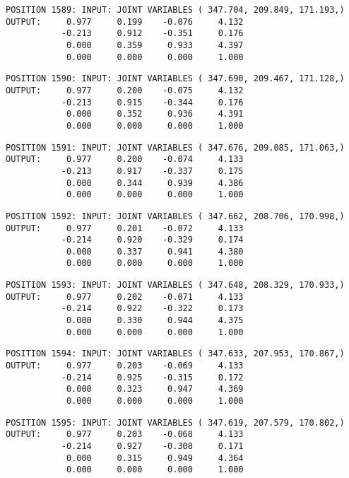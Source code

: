 \begin{verbatim}
POSITION 1589: INPUT: JOINT VARIABLES ( 347.704, 209.849, 171.193,)
OUTPUT:     0.977     0.199    -0.076     4.132
           -0.213     0.912    -0.351     0.176
            0.000     0.359     0.933     4.397
            0.000     0.000     0.000     1.000
\end{verbatim} \pagebreak[1]\begin{verbatim}
POSITION 1590: INPUT: JOINT VARIABLES ( 347.690, 209.467, 171.128,)
OUTPUT:     0.977     0.200    -0.075     4.132
           -0.213     0.915    -0.344     0.176
            0.000     0.352     0.936     4.391
            0.000     0.000     0.000     1.000
\end{verbatim} \pagebreak[1]\begin{verbatim}
POSITION 1591: INPUT: JOINT VARIABLES ( 347.676, 209.085, 171.063,)
OUTPUT:     0.977     0.200    -0.074     4.133
           -0.213     0.917    -0.337     0.175
            0.000     0.344     0.939     4.386
            0.000     0.000     0.000     1.000
\end{verbatim} \pagebreak[1]\begin{verbatim}
POSITION 1592: INPUT: JOINT VARIABLES ( 347.662, 208.706, 170.998,)
OUTPUT:     0.977     0.201    -0.072     4.133
           -0.214     0.920    -0.329     0.174
            0.000     0.337     0.941     4.380
            0.000     0.000     0.000     1.000
\end{verbatim} \pagebreak[1]\begin{verbatim}
POSITION 1593: INPUT: JOINT VARIABLES ( 347.648, 208.329, 170.933,)
OUTPUT:     0.977     0.202    -0.071     4.133
           -0.214     0.922    -0.322     0.173
            0.000     0.330     0.944     4.375
            0.000     0.000     0.000     1.000
\end{verbatim} \pagebreak[1]\begin{verbatim}
POSITION 1594: INPUT: JOINT VARIABLES ( 347.633, 207.953, 170.867,)
OUTPUT:     0.977     0.203    -0.069     4.133
           -0.214     0.925    -0.315     0.172
            0.000     0.323     0.947     4.369
            0.000     0.000     0.000     1.000
\end{verbatim} \pagebreak[1]\begin{verbatim}
POSITION 1595: INPUT: JOINT VARIABLES ( 347.619, 207.579, 170.802,)
OUTPUT:     0.977     0.203    -0.068     4.133
           -0.214     0.927    -0.308     0.171
            0.000     0.315     0.949     4.364
            0.000     0.000     0.000     1.000
\end{verbatim} \pagebreak[1]\begin{verbatim}

\end{verbatim}
